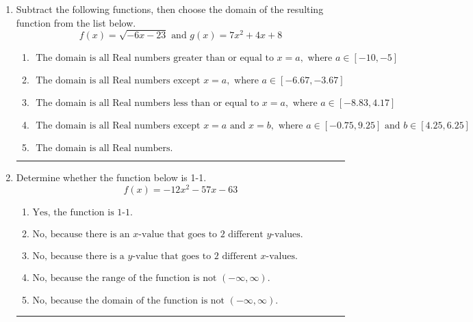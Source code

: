 \documentclass[14pt]{extbook}
\newcommand{\litem}[1]{\item#1\hspace*{-1cm}\rule{\textwidth}{0.4pt}}
\begin{document}
\begin{enumerate}
{\begin{enumerate}[label=\Alph*.]
\end{enumerate} }
\litem{
Subtract the following functions, then choose the domain of the resulting function from the list below.\[ f(x) = \sqrt{-6x-23}  \text{ and } g(x) = 7x^{2} +4 x + 8 \]\begin{enumerate}[label=\Alph*.]
\item \( \text{ The domain is all Real numbers greater than or equal to } x = a, \text{ where } a \in [-10, -5] \)
\item \( \text{ The domain is all Real numbers except } x = a, \text{ where } a \in [-6.67, -3.67] \)
\item \( \text{ The domain is all Real numbers less than or equal to } x = a, \text{ where } a \in [-8.83, 4.17] \)
\item \( \text{ The domain is all Real numbers except } x = a \text{ and } x = b, \text{ where } a \in [-0.75, 9.25] \text{ and } b \in [4.25, 6.25] \)
\item \( \text{ The domain is all Real numbers. } \)

\end{enumerate} }
\litem{
Determine whether the function below is 1-1.\[ f(x) = -12 x^2 - 57 x - 63 \]\begin{enumerate}[label=\Alph*.]
\item \( \text{Yes, the function is 1-1.} \)
\item \( \text{No, because there is an $x$-value that goes to 2 different $y$-values.} \)
\item \( \text{No, because there is a $y$-value that goes to 2 different $x$-values.} \)
\item \( \text{No, because the range of the function is not $(-\infty, \infty)$.} \)
\item \( \text{No, because the domain of the function is not $(-\infty, \infty)$.} \)

\end{enumerate} }
\end{enumerate}
\end{document}

